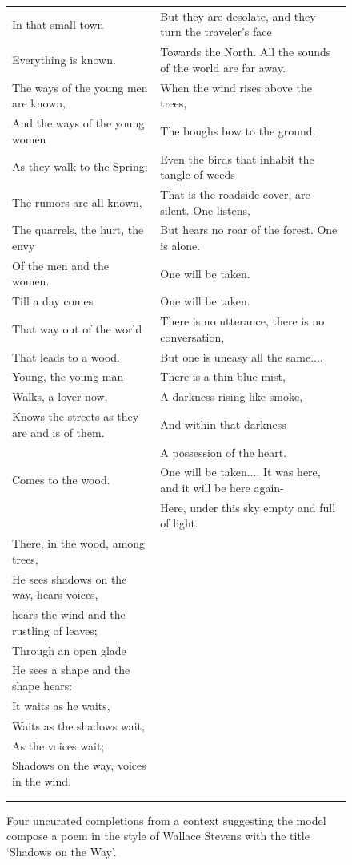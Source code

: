 \begin{figure}
{\begin{center}
\begin{tabular}{l l}
In that small town & But they are desolate, and they turn the traveler’s face\\
Everything is known. & Towards the North. All the sounds of the world are far away.\\
The ways of the young men are known, & When the wind rises above the trees,\\
And the ways of the young women & The boughs bow to the ground.\\
As they walk to the Spring; & Even the birds that inhabit the tangle of weeds\\
The rumors are all known, & That is the roadside cover, are silent. One listens,\\
The quarrels, the hurt, the envy & But hears no roar of the forest. One is alone.\\
Of the men and the women. & One will be taken.\\
Till a day comes & One will be taken.\\
That way out of the world & There is no utterance, there is no conversation,\\
That leads to a wood. & But one is uneasy all the same....\\
Young, the young man & There is a thin blue mist,\\
Walks, a lover now, & A darkness rising like smoke,\\
Knows the streets as they are and is of them. & And within that darkness\\
 & A possession of the heart.\\
Comes to the wood. & One will be taken.... It was here, and it will be here again-\\
 & Here, under this sky empty and full of light.\\
There, in the wood, among trees, & \\
He sees shadows on the way, hears voices, & \\
hears the wind and the rustling of leaves; & \\
Through an open glade & \\
He sees a shape and the shape hears: & \\
It waits as he waits, & \\
Waits as the shadows wait, & \\
As the voices wait; & \\
Shadows on the way, voices in the wind. & \\
 & \\
\\ \bottomrule \end{tabular}\end{center} }  
\caption{Four uncurated completions from a context suggesting the model compose a poem in the style of Wallace Stevens with the title `Shadows on the Way'.}  
 \label{sample:FakeStevensPoem}  
 \end{figure}